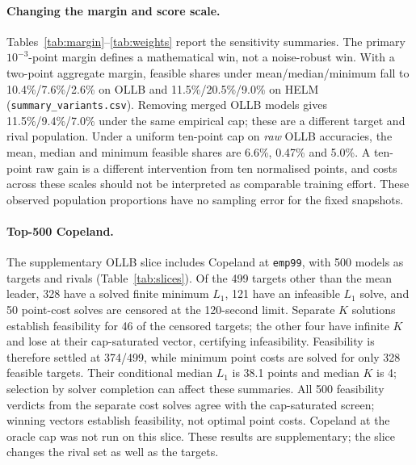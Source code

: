 \documentclass{article}
\begin{document}
\paragraph{Changing the margin and score scale.} Tables~\ref{tab:margin}--\ref{tab:weights} report the sensitivity summaries. The primary $10^{-3}$-point margin defines a mathematical win, not a noise-robust win. With a two-point aggregate margin, feasible shares under mean/median/minimum fall to 10.4\%/7.6\%/2.6\% on OLLB and 11.5\%/20.5\%/9.0\% on HELM (\texttt{summary\_variants.csv}). Removing merged OLLB models gives 11.5\%/9.4\%/7.0\% under the same empirical cap; these are a different target and rival population. Under a uniform ten-point cap on \emph{raw} OLLB accuracies, the mean, median and minimum feasible shares are 6.6\%, 0.47\% and 5.0\%. A ten-point raw gain is a different intervention from ten normalised points, and costs across these scales should not be interpreted as comparable training effort. These observed population proportions have no sampling error for the fixed snapshots.

\paragraph{Top-500 Copeland.} The supplementary OLLB slice includes Copeland at \texttt{emp99}, with 500 models as targets and rivals (Table~\ref{tab:slices}). Of the 499 targets other than the mean leader, 328 have a solved finite minimum $L_1$, 121 have an infeasible $L_1$ solve, and 50 point-cost solves are censored at the 120-second limit. Separate $K$ solutions establish feasibility for 46 of the censored targets; the other four have infinite $K$ and lose at their cap-saturated vector, certifying infeasibility. Feasibility is therefore settled at 374/499, while minimum point costs are solved for only 328 feasible targets. Their conditional median $L_1$ is 38.1 points and median $K$ is 4; selection by solver completion can affect these summaries. All 500 feasibility verdicts from the separate cost solves agree with the cap-saturated screen; winning vectors establish feasibility, not optimal point costs. Copeland at the oracle cap was not run on this slice. These results are supplementary; the slice changes the rival set as well as the targets.

\begin{table}[ht]
\centering
\caption{Copeland at \texttt{emp99} on the top-500 OLLB slice, by original mean rank. Certified feasibility uses the separate $K$ solves and cap-saturation check; no target's feasibility is unresolved. ``$L_1$ solved'' counts finite optimal point costs; infeasible cases have no finite cost. The 50 point-cost timeouts split into 46 feasible targets with unknown minimum $L_1$ and four certified infeasible targets. $^\ddagger$Both cost medians use only the solved-finite subset, so they can be selected by solver difficulty. Wilson intervals describe the certified fraction under the target-exchangeability interpretation of Appendix~\ref{app:repro}. No oracle Copeland run is included. Generated by \texttt{figures/src/tables.py}.}
\label{tab:copeland}

\end{table}
\end{document}
